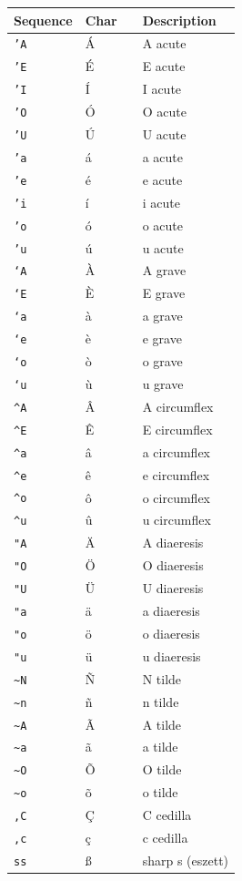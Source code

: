 \begin{longtable}{@{}llll@{}}
\toprule
Sequence & Char & & Description \\
\midrule
\endhead
\texttt{'A} & \'{A} & & A acute \\
\texttt{'E} & \'{E} & & E acute \\
\texttt{'I} & \'{I} & & I acute \\
\texttt{'O} & \'{O} & & O acute \\
\texttt{'U} & \'{U} & & U acute \\
\texttt{'a} & \'{a} & & a acute \\
\texttt{'e} & \'{e} & & e acute \\
\texttt{'i} & \'{i} & & i acute \\
\texttt{'o} & \'{o} & & o acute \\
\texttt{'u} & \'{u} & & u acute \\
\midrule
\texttt{`A} & \`{A} & & A grave \\
\texttt{`E} & \`{E} & & E grave \\
\texttt{`a} & \`{a} & & a grave \\
\texttt{`e} & \`{e} & & e grave \\
\texttt{`o} & \`{o} & & o grave \\
\texttt{`u} & \`{u} & & u grave \\
\midrule
\texttt{\^{}A} & \^{A} & & A circumflex \\
\texttt{\^{}E} & \^{E} & & E circumflex \\
\texttt{\^{}a} & \^{a} & & a circumflex \\
\texttt{\^{}e} & \^{e} & & e circumflex \\
\texttt{\^{}o} & \^{o} & & o circumflex \\
\texttt{\^{}u} & \^{u} & & u circumflex \\
\midrule
\texttt{"A} & \"{A} & & A diaeresis \\
\texttt{"O} & \"{O} & & O diaeresis \\
\texttt{"U} & \"{U} & & U diaeresis \\
\texttt{"a} & \"{a} & & a diaeresis \\
\texttt{"o} & \"{o} & & o diaeresis \\
\texttt{"u} & \"{u} & & u diaeresis \\
\midrule
\texttt{\~{}N} & \~{N} & & N tilde \\
\texttt{\~{}n} & \~{n} & & n tilde \\
\texttt{\~{}A} & \~{A} & & A tilde \\
\texttt{\~{}a} & \~{a} & & a tilde \\
\texttt{\~{}O} & \~{O} & & O tilde \\
\texttt{\~{}o} & \~{o} & & o tilde \\
\midrule
\texttt{,C} & \c{C} & & C cedilla \\
\texttt{,c} & \c{c} & & c cedilla \\
\texttt{ss} & \ss & & sharp s (eszett) \\
\bottomrule
\end{longtable}

